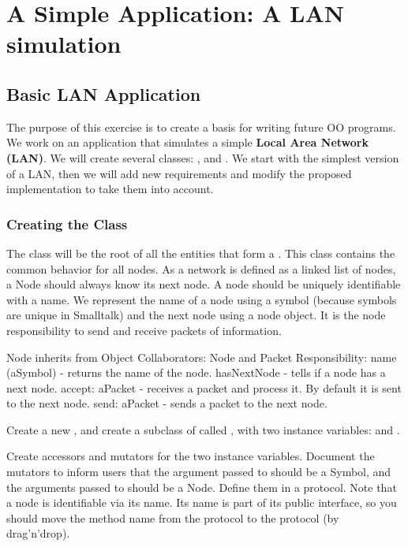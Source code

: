 \ifx\wholebook\relax\else


\fi

\chapter{A Simple Application: A LAN simulation}


\section*{Basic LAN Application }

The purpose of this exercise is to create a basis for writing
future OO programs. We work on an application that simulates a simple \textbf{Local Area Network (LAN)}.  We will create several classes: , and . We start with the simplest version of a LAN, then we will add new requirements and modify the proposed implementation to take them into account.

\subsection*{Creating the Class }

The class  will be the root of all the entities that form a . This class contains the common behavior for all nodes. As a network is defined as a linked list
of nodes, a Node should always know its next node. A node should be
uniquely identifiable with a name. We represent the name of a node
using a symbol (because symbols are unique in Smalltalk) and the
next node using a node object. It is the node responsibility to
send and receive packets of information.

\begin{scode}
Node inherits from Object
Collaborators: Node and Packet
Responsibility:
name (aSymbol) - returns the name of the node.
hasNextNode - tells if a node has a next node.
accept: aPacket - receives a packet and process it.
By default it is sent to the next node.
send: aPacket - sends a packet to the next node.
\end{scode}


\exercise  Create a new \category {}, and create a
subclass of  called , with two instance
variables:  and .

\exercise  Create accessors and mutators for the two instance
variables. Document the mutators to inform users that the argument
passed to  should be a Symbol, and the arguments
passed to  should be a Node. Define them in a
 protocol. Note that a node is identifiable via
its name. Its name is part of its public interface, so you should
move the method name from the  protocol to the
 protocol (by drag'n'drop). \\

